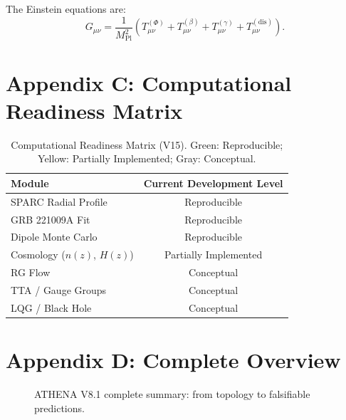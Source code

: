 \documentclass[12pt,a4paper]{article}
\numberwithin{equation}{section}
\begin{document}
The Einstein equations are:
\begin{equation}
G_{\mu\nu} = \frac{1}{M_{\text{Pl}}^2} \left( T_{\mu\nu}^{(\Phi)} + T_{\mu\nu}^{(\beta)} + T_{\mu\nu}^{(\gamma)} + T_{\mu\nu}^{(\text{dis})} \right).
\end{equation}

\section{Appendix C: Computational Readiness Matrix}

\begin{table}[h]
\centering
\caption{Computational Readiness Matrix (V15). Green: Reproducible; Yellow: Partially Implemented; Gray: Conceptual.}
\begin{tabular}{l c}
\toprule
\textbf{Module} & \textbf{Current Development Level} \\
\midrule
SPARC Radial Profile & \textcolor{green!70}{Reproducible} \\
GRB 221009A Fit & \textcolor{green!70}{Reproducible} \\
Dipole Monte Carlo & \textcolor{green!70}{Reproducible} \\
Cosmology ($n(z)$, $H(z)$) & \textcolor{yellow!80}{Partially Implemented} \\
RG Flow & \textcolor{gray!60}{Conceptual} \\
TTA / Gauge Groups & \textcolor{gray!60}{Conceptual} \\
LQG / Black Hole & \textcolor{gray!60}{Conceptual} \\
\bottomrule
\end{tabular}
\label{tab:readiness}
\end{table}

\section{Appendix D: Complete Overview}

\begin{figure}[h]
\centering
{}
\caption{ATHENA V8.1 complete summary: from topology to falsifiable predictions.}
\label{fig:overview}
\end{figure}
\end{document}
